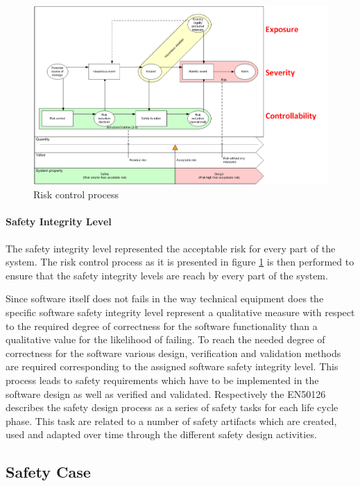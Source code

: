 \documentclass{template/openetcs_report}
\begin{document}
\begin{figure}[htbp]
\centering
\includegraphics[width=0.9\linewidth]{bld_2013-06-19_Risk-control-modell_1-0_jw}
\caption{Risk control process \cite{Schnieder.2013}}
\label{fig:Risk-control-modell-eng}
\end{figure}

\paragraph{Safety Integrity Level}

The safety integrity level represented the acceptable risk for every part of the system. The risk control process as it is presented in figure \ref{fig:Risk-control-modell-eng} is then performed to ensure that the safety integrity levels are reach by every part of the system.

Since software itself does not fails in the way technical equipment does the specific software safety integrity level represent a qualitative measure with respect to the required degree of correctness for the software functionality than a qualitative value for the likelihood of failing. To reach the needed degree of correctness for the software various design, verification and validation methods are required corresponding to the assigned software safety integrity level. This process leads to safety requirements which have to be implemented in the software design as well as verified and validated. Respectively the EN50126 describes the safety design process as a series of safety tasks for each life cycle phase. This task are related to a number of safety artifacts which are created, used and adapted over time through the different safety design activities.


\subsection{Safety Case}
\end{document}
